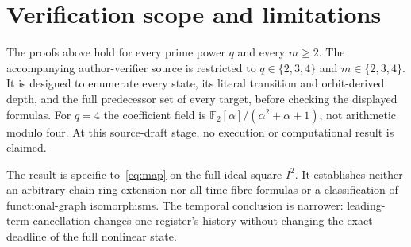 \section{Verification scope and limitations}
\label{sec:scope}

The proofs above hold for every prime power $q$ and every $m\geq2$.
The accompanying author-verifier source is restricted to
$q\in\{2,3,4\}$ and $m\in\{2,3,4\}$. It is designed to enumerate every
state, its literal transition and orbit-derived depth, and the full
predecessor set of every target, before checking the displayed formulas.
For $q=4$ the coefficient field is
$\mathbb F_2[\alpha]/(\alpha^2+\alpha+1)$, not arithmetic modulo four.
At this source-draft stage, no execution or computational result is claimed.

The result is specific to~\eqref{eq:map} on the full ideal square $I^2$.
It establishes neither an arbitrary-chain-ring extension nor all-time fibre
formulas or a classification of functional-graph isomorphisms. The temporal
conclusion is narrower: leading-term cancellation changes one register's
history without changing the exact deadline of the full nonlinear state.
